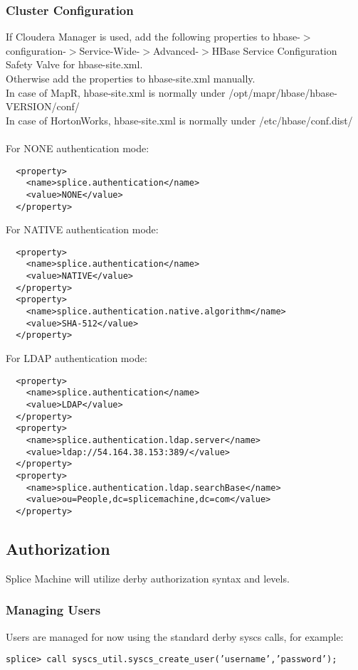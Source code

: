 \documentclass{article}
\begin{document}
\subsubsection{Cluster Configuration}
If Cloudera Manager is used, add the following properties to hbase-$>$configuration-$>$Service-Wide-$>$Advanced-$>$HBase Service Configuration Safety Valve for hbase-site.xml. \\
Otherwise add the properties to hbase-site.xml manually. \\
In case of MapR, hbase-site.xml is normally under /opt/mapr/hbase/hbase-VERSION/conf/ \\
In case of HortonWorks, hbase-site.xml is normally under /etc/hbase/conf.dist/ \\ \\
For NONE authentication mode:
\begin{lstlisting}
  <property> 
    <name>splice.authentication</name> 
    <value>NONE</value> 
  </property> 
\end{lstlisting}
For NATIVE authentication mode: 
\begin{lstlisting}
  <property> 
    <name>splice.authentication</name> 
    <value>NATIVE</value> 
  </property> 
  <property> 
    <name>splice.authentication.native.algorithm</name> 
    <value>SHA-512</value> 
  </property> 
\end{lstlisting} 
For LDAP authentication mode: 
\begin{lstlisting}
  <property> 
    <name>splice.authentication</name> 
    <value>LDAP</value> 
  </property> 
  <property> 
    <name>splice.authentication.ldap.server</name> 
    <value>ldap://54.164.38.153:389/</value> 
  </property> 
  <property> 
    <name>splice.authentication.ldap.searchBase</name> 
    <value>ou=People,dc=splicemachine,dc=com</value> 
  </property> 
\end{lstlisting}
 

\subsection{Authorization}
Splice Machine will utilize derby authorization syntax and levels. 

\subsubsection{Managing Users}
Users are managed for now using the standard derby syscs calls, for example:

\texttt{splice> call syscs\_util.syscs\_create\_user('username','password');}
\end{document}
